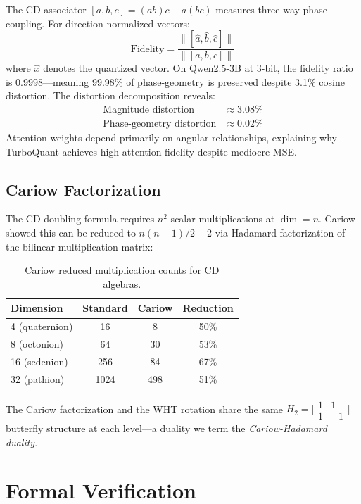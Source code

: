 \documentclass[letterpaper,11pt]{article}
\newcommand{\norm}[1]{\lVert #1 \rVert}
\begin{document}
The CD associator $[a,b,c] = (ab)c - a(bc)$ measures three-way
phase coupling. For direction-normalized vectors:
\[
  \text{Fidelity} = \frac{\norm{[\hat{a},\hat{b},\hat{c}]}}
                          {\norm{[a,b,c]}}
\]
where $\hat{x}$ denotes the quantized vector.
On Qwen2.5-3B at 3-bit, the fidelity ratio is 0.9998---meaning
99.98\% of phase-geometry is preserved despite 3.1\% cosine distortion.
The distortion decomposition reveals:
\begin{align*}
  \text{Magnitude distortion} &\approx 3.08\% \\
  \text{Phase-geometry distortion} &\approx 0.02\%
\end{align*}
Attention weights depend primarily on angular relationships,
explaining why TurboQuant achieves high attention fidelity despite
mediocre MSE.

\subsection{Cariow Factorization}

The CD doubling formula requires $n^2$ scalar multiplications at $\dim = n$.
Cariow~\cite{cariow2012} showed this can be reduced to $n(n-1)/2 + 2$
via Hadamard factorization of the bilinear multiplication matrix:

\begin{table}[ht]
\centering
\caption{Cariow reduced multiplication counts for CD algebras.}
\label{tab:cariow}
\begin{tabular}{lccc}
\toprule
Dimension & Standard & Cariow & Reduction \\
\midrule
4 (quaternion) & 16 & 8 & 50\% \\
8 (octonion)   & 64 & 30 & 53\% \\
16 (sedenion)  & 256 & 84 & 67\% \\
32 (pathion)   & 1024 & 498 & 51\% \\
\bottomrule
\end{tabular}
\end{table}

The Cariow factorization and the WHT rotation share the same
$H_2 = \bigl[\begin{smallmatrix} 1 & 1 \\ 1 & -1 \end{smallmatrix}\bigr]$
butterfly structure at each level---a duality we term the
\emph{Cariow-Hadamard duality}.

\section{Formal Verification}
\label{sec:verification}
\end{document}
